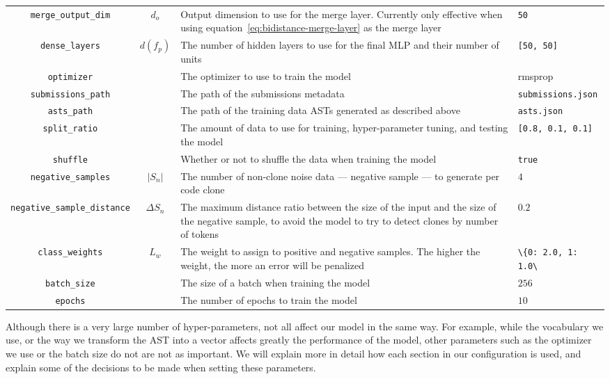 \begin{table}[p]
  \begin{center}
    \begin{tabularx}{\textwidth}{c c X l}
      \lstinline{merge_output_dim} & $d_o$ & Output dimension to use for the
      merge layer. Currently only effective when using
      equation~\ref{eq:bidistance-merge-layer} as the merge layer & \lstinline{50}\\
      \lstinline{dense_layers} & $d(f_p)$ & The number of hidden layers to use for the
      final MLP and their number of units & \lstinline{[50, 50]}\\
      \lstinline{optimizer} & & The optimizer to use to train the model & rmsprop\\
      \lstinline{submissions_path} & & The path of the submissions metadata & \lstinline{submissions.json}\\
      \lstinline{asts_path} & & The path of the training data ASTs generated
      as described above & \lstinline{asts.json}\\
      \lstinline{split_ratio} & & The amount of data to use for training,
      hyper-parameter tuning, and testing the model & \lstinline{[0.8, 0.1, 0.1]}\\
      \lstinline{shuffle} & & Whether or not to shuffle the data when training
      the model & \lstinline{true}\\
      \lstinline{negative_samples} & $|S_n|$ & The number of non-clone noise data ---
      negative sample --- to generate per code clone & $4$\\
      \lstinline{negative_sample_distance} & $\Delta S_n$ & The maximum distance ratio
      between the size of the input and the size of the negative sample, to avoid
      the model to try to detect clones by number of tokens & $0.2$\\
      \lstinline{class_weights} & $L_w$ & The weight to assign to positive and
      negative samples. The higher the weight, the more an error will be
      penalized & \lstinline{\{0: 2.0, 1: 1.0\}}\\
      \lstinline{batch_size} &  & The size of a batch when training the model & $256$\\
      \lstinline{epochs} & & The number of epochs to train the model & $10$\\
      \bottomrule
    \end{tabularx}
  \end{center}
\end{table}
%
Although there is a very large number of hyper-parameters, not all affect our
model in the same way. For example, while the vocabulary we use, or the way we
transform the AST into a vector affects greatly the performance of the model,
other parameters such as the optimizer we use or the batch size do not are not
as important. We will explain more in detail how each section in our
configuration is used, and explain some of the decisions to be made when setting
these parameters.

